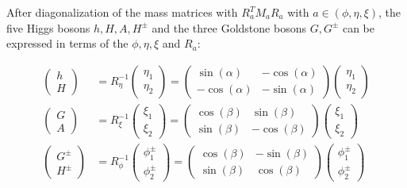 \documentclass[12pt,oneside]{book}
\begin{document}
After diagonalization of the mass matrices with $R_{a}^T M_a R_a$ with $a \in (\phi, \eta, \xi)$, the five Higgs bosons $h, H, A, H^{\pm}$ and the three Goldstone bosons $G, G^{\pm}$ can be expressed in terms of the $\phi, \eta, \xi$ and $R_a$:

\begin{align}
    \begin{pmatrix} h \\ H \end{pmatrix} &=  R^{-1}_\eta \begin{pmatrix} \eta_1 \\ \eta_2 \end{pmatrix} =  \begin{pmatrix} \sin(\alpha) & - \cos(\alpha) \\ -\cos(\alpha) & -\sin(\alpha) \end{pmatrix} \begin{pmatrix} \eta_1 \\ \eta_2 \end{pmatrix} \\
    \begin{pmatrix} G \\ A \end{pmatrix} &=  R^{-1}_\xi \begin{pmatrix} \xi_1 \\ \xi_2 \end{pmatrix} =  \begin{pmatrix} \cos(\beta) & \sin(\beta) \\ \sin(\beta) & -\cos(\beta) \end{pmatrix} \begin{pmatrix} \xi_1 \\ \xi_2 \end{pmatrix} \nonumber \\
    \begin{pmatrix} G^{\pm} \\ H^{\pm} \end{pmatrix} &=  R^{-1}_\phi \begin{pmatrix} \phi_1^{\pm} \\ \phi_2^{\pm} \end{pmatrix} =  \begin{pmatrix} \cos(\beta) & - \sin(\beta) \\ \sin(\beta) & \cos(\beta) \end{pmatrix} \begin{pmatrix} \phi_1^{\pm} \\ \phi_2^{\pm} \end{pmatrix} \nonumber
\end{align}
\end{document}
